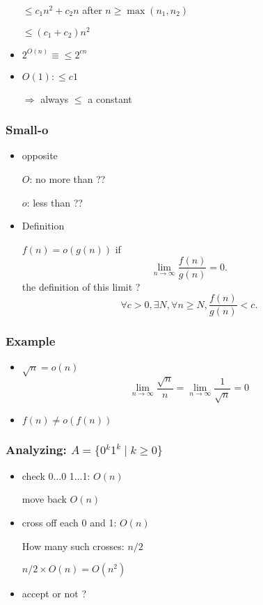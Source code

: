 \begin{frame}[allowframebreaks]
\begin{itemize}
$\leq c_1 n^2 + c_2 n $ after $n \geq \max(n_1,n_2)$

$\leq (c_1+c_2) n^2$
\item $2^{O(n)} \equiv \leq 2^{cn}$
\item $O(1): \leq c 1$

$\Rightarrow$ always $\leq$ a constant
\end{itemize}\end{frame} \begin{frame}[allowframebreaks] \frametitle{Small-o}
  \begin{itemize}
\item opposite

$O$: no more than ??

$o$: less than ??
\item Definition 

$f(n)=o(g(n))$ if
  \begin{equation*}
    \lim_{n\rightarrow \infty} \frac{f(n)}{g(n)} = 0.
  \end{equation*}
the definition of this limit ?
\begin{equation*}
  \forall c > 0, \exists N, \forall n \geq N,
\frac{f(n)}{g(n)} < c.
\end{equation*}
\end{itemize}\end{frame} \begin{frame}[allowframebreaks] \frametitle{Example}
  \begin{itemize}
\item $\sqrt{n}= o(n)$
  \begin{equation*}
    \lim_{n \rightarrow \infty} \frac{\sqrt{n}}{n}
=
   \lim_{n \rightarrow \infty} \frac{1}{\sqrt{n}}=0
  \end{equation*}
\item $f(n) 
\neq o(f(n))$
\end{itemize}\end{frame} \begin{frame}[allowframebreaks] \frametitle{Analyzing: $A=\{0^k 1^k\mid k \geq 0\}$}
    \begin{itemize}
\item check 0...0 1...1: $O(n)$

move back $O(n)$
\item cross off each 0 and 1: $O(n)$

How many such crosses: $n/2$

$n/2 \times O(n) = O(n^2)$
\item accept or not ?


\end{itemize}
\end{frame}
